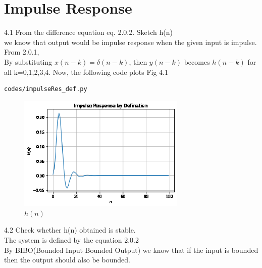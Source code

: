 \documentclass[journal,12pt,twocolumn]{IEEEtran}
\begin{document}
\section{Impulse Response}
4.1 From the difference equation eq. 2.0.2. Sketch h(n)
\label{prob:h(n)}
\\
\solution
we know that output would be impulse response when the given input is impulse. 
From 2.0.1, \\
By substituting $x(n-k) = \delta(n-k)$, then $y(n-k)$ becomes $h(n-k)$ for all k=0,1,2,3,4.
Now, the following code plots Fig 4.1
\begin{lstlisting}
codes/impulseRes_def.py
\end{lstlisting}
\begin{figure}[!ht]
\centering
\includegraphics[width=8cm]{./figs/impy_def.eps}
\caption{$h(n)$}
\label{fig:h(n)}
\end{figure}
4.2 Check whether h(n) obtained is stable.
\\
\solution
The system is defined by the equation 2.0.2 \\
By BIBO(Bounded Input Bounded Output) we know that if the input is bounded then the output should also be bounded.
\end{document}

